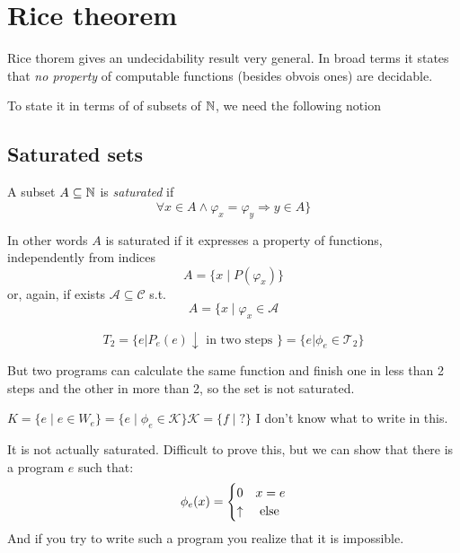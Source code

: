 \chapter {Rice theorem}

Rice thorem gives an undecidability result very general. In broad
terms it states that \emph{no property} of computable functions
(besides obvois ones) are decidable.

To state it in terms of of subsets of $\mathbb{N}$, we need the following
notion

\section{Saturated sets}
\begin{definition}
  A subset $A \subseteq \mathbb{N}$ is \emph{saturated} if
  \[
    \forall x \in A \wedge \varphi_x = \varphi_y \Rightarrow y \in A \}
  \]
\end{definition}

In other words $A$ is saturated if it expresses a property of
functions, independently from indices
\[A = \{x \mid P(\varphi_x)\}\]
or, again, if exists $\mathcal{A} \subseteq \mathcal{C}$ s.t.
\[A = \{ x \mid \varphi_x \in \mathcal{A}\]

\begin{example}
  \[
    T_2 = \{ e | P_e(e)\downarrow \mbox{ in two steps } \} =
    \{e|\phi_e \in \mathcal{T}_2 \}
  \]

  But two programs can calculate the same function and finish one in
  less than 2 steps and the other in more than 2, so the set is not
  saturated.
\end{example}

\begin{example}
  
  \begin{center}
    $ K = \{e \mid e\in W_e \} = \{e \mid \phi_e\in \mathcal{K} \}
  \mathcal{K} = \{f \mid ? \}$ I don't know what to write in this.
  \end{center}

  It is not actually saturated. Difficult to prove this, but we can
  show that there is a program $e$ such that:
  \begin{equation*}
    \phi_e(x) = \begin{cases}
      0 & x = e \\
      \uparrow & $ else $
    \end{cases}
  \end{equation*}
  And if you try to write such a program you realize that it is
  impossible.
\end{example}

